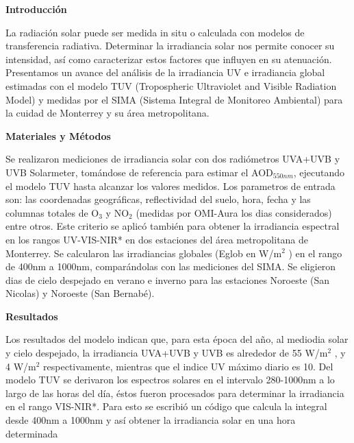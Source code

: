 \documentclass{article}
\begin{document}
\begin{multicols}{2}
\changefontsizes{15pt}
\vspace*{-1cm}
\begin{center}
\large \textbf{ \textcolor{rb}{Introducción}}
\end{center}
\vspace*{-0.13cm}
La radiación solar puede ser medida in situ o calculada con modelos de transferencia radiativa. Determinar la irradiancia solar nos permite conocer su intensidad, así como caracterizar estos factores que influyen en su atenuación. Presentamos un avance del análisis de la irradiancia UV e irradiancia global estimadas con el modelo TUV (Tropospheric Ultraviolet and Visible Radiation Model) y medidas por el SIMA (Sistema Integral de Monitoreo Ambiental) para la cuidad de Monterrey y su área metropolitana.
\vspace*{-0.2cm}
\begin{center}
\large \textbf{\textcolor{rb}{Materiales y Métodos}}
\end{center}
Se realizaron mediciones de irradiancia solar con dos radiómetros UVA+UVB y UVB Solarmeter, tomándose de referencia para estimar el AOD$_{550nm}$, ejecutando el modelo TUV hasta alcanzar los valores medidos. Los parametros de entrada son: las coordenadas geográficas, reflectividad del suelo, hora, fecha y las columnas totales de O$_3$ y NO$_2$ (medidas por OMI-Aura los dias considerados) entre otros. 
Este criterio se aplicó también para obtener la irradiancia espectral en los rangos UV-VIS-NIR* en dos estaciones del área metropolitana de Monterrey. Se calcularon las irradiancias globales (Eglob en W/m$^2$ ) en el rango de 400nm a 1000nm, comparándolas con las mediciones del SIMA. Se eligieron dias de cielo despejado en verano e inverno para las estaciones Noroeste (San Nicolas) y Noroeste (San Bernabé).
\vspace*{-0.3cm}
\begin{center}
\large \textbf{\textcolor{rb}{Resultados}}
\end{center}
Los resultados del modelo indican que, para esta época del año, al mediodia solar y cielo despejado, la irradiancia UVA+UVB y UVB es alrededor de 55 W/m$^2$ , y 4 W/m$^2$ respectivamente, mientras que el indice UV máximo diario es 10. Del modelo TUV se derivaron los espectros solares en el intervalo 280-1000nm a lo largo de las horas del día, éstos fueron procesados para determinar la irradiancia en el rango VIS-NIR*. Para esto se escribió un código que calcula la integral desde 400nm a 1000nm y así obtener la irradiancia solar en una hora determinada\\

\end{multicols}
\end{document}
